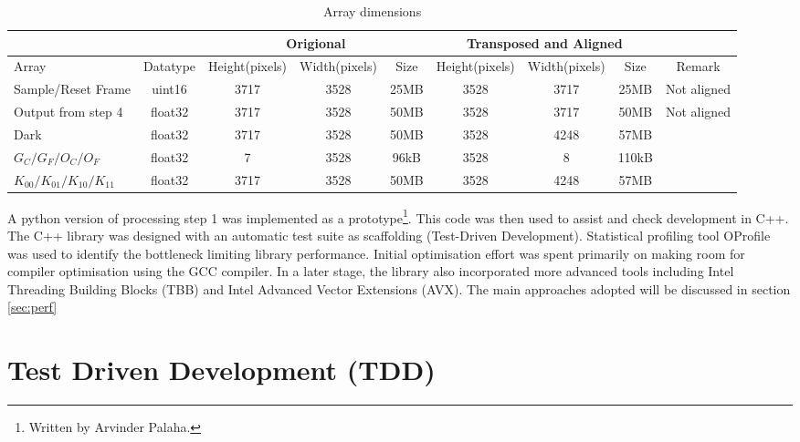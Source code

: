 \documentclass[journal]{IEEEtran}
\begin{document}
\begin{table*}[t]

\centering
\begin{tabular}{l c  | c c c  |c c c c}
\hline
&&
\multicolumn{3}{c|}{Origional}&
\multicolumn{3}{c}{Transposed and Aligned}&\\
\hline \hline
Array 							& Datatype  &Height(pixels) & Width(pixels)	    &Size       &Height(pixels) & Width(pixels)	    &Size   &Remark\\
\hline
Sample/Reset Frame       		& uint16    &3717		    & 3528 		        &25MB       & 3528		    & 3717 		        & 25MB  &Not aligned\\
\hline
Output from step 4				& float32   &3717	        & 3528		        &50MB       & 3528	        & 3717		        & 50MB  &Not aligned\\
\hline
Dark        					& float32   &3717	        & 3528		        &50MB       & 3528	        & 4248		        & 57MB  \\
\hline
$G_C/G_F/O_C/O_F$				& float32   & 7   	        &3528	            &96kB       & 3528   	    & 8 	            & 110kB \\
\hline
$K_{00}/K_{01}/K_{10}/K_{11}$   & float32   &3717	        & 3528              &50MB       & 3528	        & 4248              & 57MB  \\
\hline
\end{tabular}
\caption{Array dimensions}\label{array_dims}
\end{table*}

A python version of processing step 1 was implemented as a prototype\footnote{Written by Arvinder Palaha.}. This code was then used to assist and check development in C++. The C++ library was designed with an automatic test suite as scaffolding (Test-Driven Development). Statistical profiling tool OProfile was used to identify the bottleneck limiting library performance. Initial optimisation effort was spent primarily on making room for compiler optimisation using the GCC compiler. In a later stage, the library also incorporated more advanced tools including Intel Threading Building Blocks (TBB)\cite{TBBbook} and Intel Advanced Vector Extensions (AVX)\cite{AVX}. The main approaches adopted will be discussed in section \ref{sec:perf}


\section{Test Driven Development (TDD)} %
\end{document}

